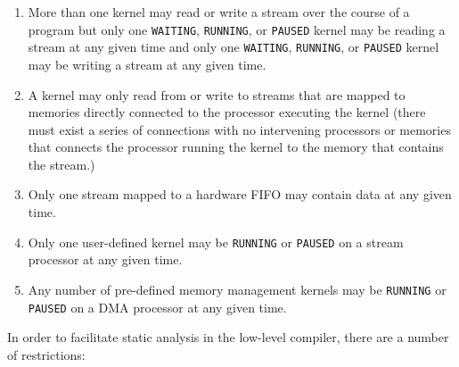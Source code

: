 \begin{enumerate}

\item More than one kernel may read or write a stream over the course of a program but only one {\tt WAITING}, {\tt RUNNING}, or {\tt PAUSED} kernel may be reading a stream at any given time and only one {\tt WAITING}, {\tt RUNNING}, or {\tt PAUSED} kernel may be writing a stream at any given time.

\item A kernel may only read from or write to streams that are mapped to memories directly connected to the processor executing the kernel (there must exist a series of connections with no intervening 
processors or memories that connects the processor running the kernel to 
the memory that contains the stream.)

\item Only one stream mapped to a hardware FIFO may contain data at any given time.

\item Only one user-defined kernel may be {\tt RUNNING} or {\tt PAUSED} on a stream processor at any given time.

\item Any number of pre-defined memory management kernels may be {\tt RUNNING} or {\tt PAUSED} on a DMA processor at any given time.

\end{enumerate}

In order to facilitate static analysis in the
low-level compiler, there are a number of restrictions:

